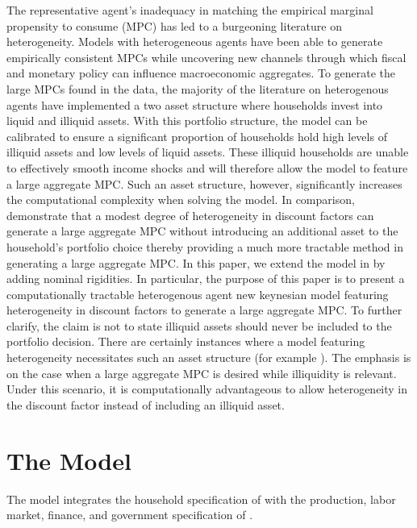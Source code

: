 \documentclass[titlepage]{\econtex}\providecommand{\texname}{FBS-NK}
\begin{document}
The representative agent's inadequacy in matching the empirical marginal propensity to consume (MPC) has led to a burgeoning literature on heterogeneity. Models with heterogeneous agents have been able to generate empirically consistent MPCs while uncovering new channels through which fiscal and monetary policy can influence macroeconomic aggregates. To generate the large MPCs found in the data, the majority of the literature on heterogenous agents have implemented a two asset structure where households invest into liquid and illiquid assets. With this portfolio structure, the model can be calibrated to ensure a significant proportion of households hold high levels of  illiquid assets and low levels of liquid assets. These illiquid households are unable to effectively smooth income shocks and will therefore allow the model to feature a large aggregate MPC. Such an asset structure, however, significantly increases the computational complexity when solving the model. In comparison, \cite{carroll2017distribution}  demonstrate that a modest degree of heterogeneity in discount factors can generate a large aggregate MPC without introducing an additional asset to the household's portfolio choice thereby providing a much more tractable method in generating a large aggregate MPC. In this paper, we extend the model in \cite{carroll2017distribution} by adding nominal rigidities. In particular, the purpose of this paper is to present a computationally tractable heterogenous agent new keynesian model featuring heterogeneity in discount factors to generate a large aggregate MPC. To further clarify, the claim is not to state illiquid assets should never be included to the portfolio decision. There are certainly instances where a model featuring heterogeneity necessitates such an asset structure (for example \cite{bayer2019precautionary}). The emphasis is on the case when a large aggregate MPC is desired while illiquidity is relevant. Under this scenario, it is computationally advantageous to allow heterogeneity in the discount factor instead of including an illiquid asset.




\hypertarget{The-Model}{}
\section{The Model}

The model integrates the household specification of \cite{carroll2017distribution} with the production, labor market, finance, and government specification of \cite{auclert2020micro}. 
\end{document}
